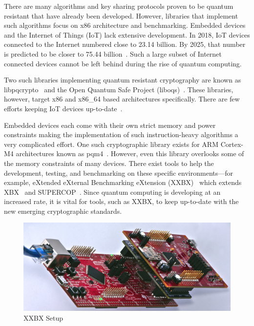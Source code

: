 \documentclass[10pt]{article}
\begin{document}
There are many algorithms and key sharing protocols proven to be quantum resistant that have 
already been developed. However, libraries that implement such algorithms focus on x86 
architecture and benchmarking. Embedded devices and the Internet of Things (IoT) lack extensive 
development. In 2018, IoT devices connected to the Internet numbered close to 23.14 billion. 
By 2025, that number is predicted to be closer to 75.44 billion~\cite{tobefound}.
Such a large subset of Internet 
connected devices cannot be left behind during the rise of quantum computing.

Two such libraries implementing quantum resistant cryptography are known as libpqcrypto~\cite{libpqcrypto} 
and the Open Quantum Safe Project (liboqs)~\cite{openquantumsave}. These libraries, however, target 
x86 and x86\_64 based architectures specifically. There are few efforts keeping IoT devices 
up-to-date~\cite{MALINA2018462}.

Embedded devices each come with their own strict memory and power constraints making the 
implementation of such instruction-heavy algorithms a very complicated effort. One such 
cryptographic library exists for ARM Cortex-M4 architectures known as pqm4~\cite{PQM4}. 
However, even this library overlooks some of the memory constraints of many devices. 
There exist tools to help the development, testing, and benchmarking on these specific 
environments—for example, eXtended eXternal Benchmarking eXtension (XXBX)~\cite{PK15,Kap16} which extends 
XBX~\cite{xbx} and SUPERCOP~\cite{SUP06}.  Since quantum computing is developing at an increased rate, 
it is vital for tools, such as XXBX, to keep up-to-date with the 
new emerging cryptographic standards.

\begin{figure}[ht]
    \centering
    \includegraphics[scale=1.0]{../figures/xxbx-tilted}
    \caption{XXBX Setup}
    \label{fig:xxbx_setup}
\end{figure}
\end{document}
